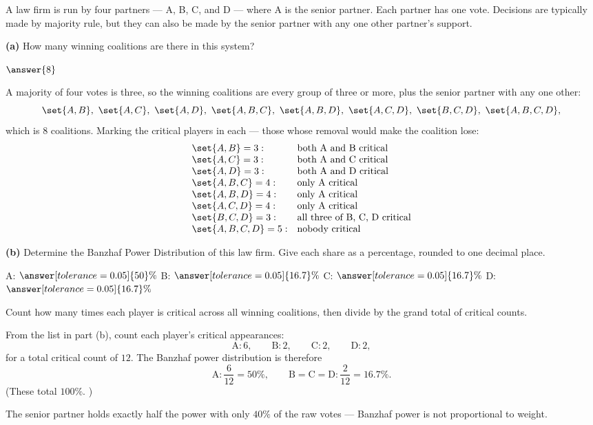 \documentclass[12pt]{ximera}
\begin{document}
\begin{problem}
A law firm is run by four partners --- A, B, C, and D --- where A is the senior
partner. Each partner has one vote. Decisions are typically made by majority rule, but they can
also be made by the senior partner with any one other partner's support.

\begin{prompt}
\textbf{(a)} How many winning coalitions are there in this system?

$\answer{8}$

\begin{feedback}
A majority of four votes is three, so the winning coalitions are every group of three or
more, plus the senior partner with any one other:
\[
\set{A,B},\ \set{A,C},\ \set{A,D},\ \set{A,B,C},\ \set{A,B,D},\ \set{A,C,D},\
\set{B,C,D},\ \set{A,B,C,D},
\]
which is $8$ coalitions. Marking the critical players in each --- those whose removal
would make the coalition lose:
\[
\begin{array}{ll}
\set{A,B}=3: & \text{both A and B critical}\\
\set{A,C}=3: & \text{both A and C critical}\\
\set{A,D}=3: & \text{both A and D critical}\\
\set{A,B,C}=4: & \text{only A critical}\\
\set{A,B,D}=4: & \text{only A critical}\\
\set{A,C,D}=4: & \text{only A critical}\\
\set{B,C,D}=3: & \text{all three of B, C, D critical}\\
\set{A,B,C,D}=5: & \text{nobody critical}
\end{array}
\]
\end{feedback}
\end{prompt}

\begin{prompt}
\textbf{(b)} Determine the Banzhaf Power Distribution of this law firm. Give each
share as a percentage, rounded to one decimal place.

A: $\answer[tolerance=0.05]{50}\%$ \qquad
B: $\answer[tolerance=0.05]{16.7}\%$ \qquad
C: $\answer[tolerance=0.05]{16.7}\%$ \qquad
D: $\answer[tolerance=0.05]{16.7}\%$

\begin{hint}
Count how many times each player is critical across all winning coalitions, then
divide by the grand total of critical counts.
\end{hint}

\begin{feedback}
From the list in part (b), count each player's critical appearances:
\[
\text{A}: 6, \qquad \text{B}: 2, \qquad \text{C}: 2, \qquad \text{D}: 2,
\]
for a total critical count of $12$. The Banzhaf power distribution is therefore
\[
\text{A}: \frac{6}{12}=50\%, \qquad
\text{B}=\text{C}=\text{D}: \frac{2}{12}=16.7\%.
\]
(These total $100\%$. \checkmark)

The senior partner holds exactly half the power with only $40\%$ of the raw votes ---
Banzhaf power is not proportional to weight.
\end{feedback}
\end{prompt}
\end{problem}
\end{document}
